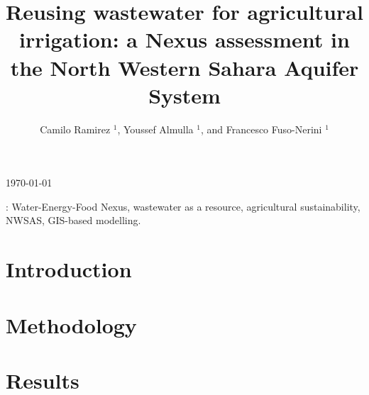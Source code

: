 \documentclass[12pt]{iopart}
\begin{document}
\title[Reusing wastewater in agriculture: a Nexus assessment in the NWSAS]{Reusing wastewater for agricultural irrigation: a Nexus assessment in the North Western Sahara Aquifer System}

\author{Camilo Ramirez $^{1}$, Youssef Almulla $^{1}$, and Francesco Fuso-Nerini $^{1}$}

\address{$^{1}$ KTH Royal Institute of Technology, Stockholm, Sweden}
\vspace{10pt}
\begin{indented}
\item[]\today
\end{indented}

\begin{abstract}

\end{abstract}

\vspace{2pc}
: Water-Energy-Food Nexus, wastewater as a resource, agricultural sustainability, NWSAS, GIS-based modelling.

%
% 
%
\section{Introduction}


\newpage
\section{Methodology}


\section{Results}

\end{document}
